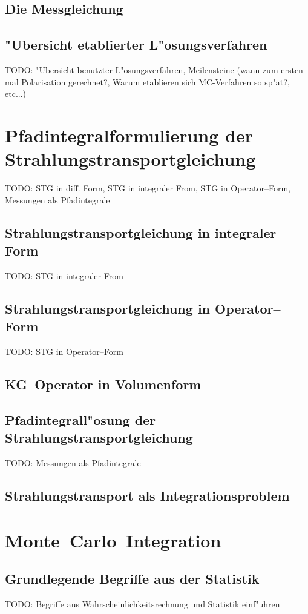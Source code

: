 \documentclass[11pt,a4paper,DIVcalc,BCOR8mm,titlepage,twoside]{scrartcl}
\begin{document}
	
	
	
	\subsection{Die Messgleichung}
	\subsection{"Ubersicht etablierter L"osungsverfahren}
	TODO: "Ubersicht benutzter L"osungsverfahren, Meilensteine (wann zum ersten mal Polarisation gerechnet?, Warum etablieren sich MC-Verfahren so sp"at?, etc...)
		
	\section{Pfadintegralformulierung der Strahlungstransportgleichung}
	TODO: STG in diff. Form, STG in integraler From, STG in Operator--Form, Messungen als Pfadintegrale
	\subsection{Strahlungstransportgleichung in integraler Form}
	TODO: STG in integraler From
	\subsection{Strahlungstransportgleichung in Operator--Form}
	TODO: STG in Operator--Form
	\subsection{KG--Operator in Volumenform}
	\subsection{Pfadintegrall"osung der Strahlungstransportgleichung}
	TODO: Messungen als Pfadintegrale
	\subsection{Strahlungstransport als Integrationsproblem}
	
	\section{Monte--Carlo--Integration}
	\subsection{Grundlegende Begriffe aus der Statistik}
	TODO: Begriffe aus Wahrscheinlichkeitsrechnung und Statistik einf"uhren
\end{document}
